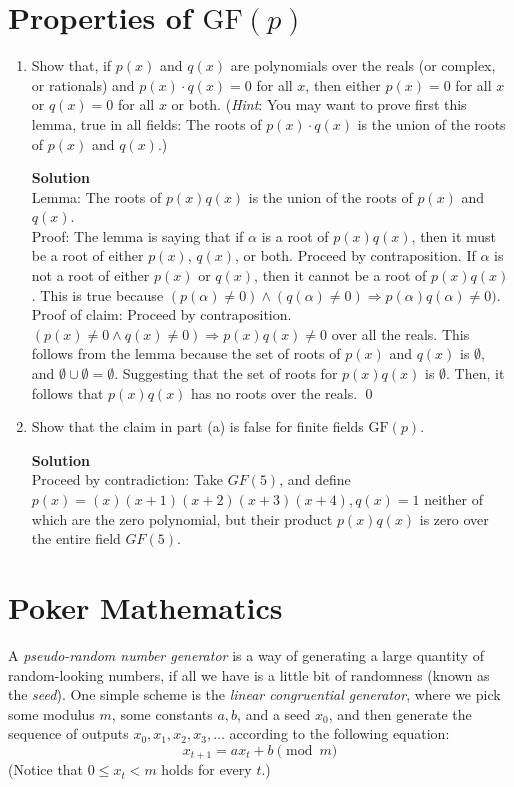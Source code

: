 \documentclass[11pt]{article}
\newcommand*{\Question}[1]{\section{#1}}
\newenvironment{Parts}{\begin{enumerate}[label=(\alph*)]}{\end{enumerate}}
\newcommand*{\Part}{\item}
\newcommand*{\GF}{\text{GF}}
\begin{document}
\Question{Properties of $\GF(p)$}

\begin{Parts}
    \Part Show that, if $p(x)$ and $q(x)$ are polynomials over the
    reals (or complex, or rationals) and $p(x)\cdot q(x) = 0$ for all
    $x$, then either $p(x)=0$ for all $x$ or $q(x)=0$ for all $x$ or both.
    (\textit{Hint}: You may want to prove first this lemma, true in all fields:
    The roots of $p(x)\cdot q(x)$ is the union of the roots of $p(x)$ and $q(x)$.)
\begin{mdframed} \textbf{Solution} \\
Lemma: The roots of $p(x)q(x)$ is the union of the roots of $p(x)$ and $q(x)$. \\
Proof: The lemma is saying that if $\alpha$ is a root of $p(x)q(x)$, then it must be a root of either $p(x)$, $q(x)$, or both. Proceed by contraposition. If $\alpha$ is not a root of either $p(x)$ or $q(x)$, then it cannot be a root of $p(x)q(x)$. This is true because $(p(\alpha) \neq 0) \land (q(\alpha) \neq 0) \Rightarrow p(\alpha)q(\alpha) \neq 0)$. \\  
Proof of claim: Proceed by contraposition. $(p(x) \neq 0 \land q(x) \neq 0) \Rightarrow p(x)q(x) \neq 0$ over all the reals. This follows from the lemma because the set of roots of $p(x)$ and $q(x)$ is $\emptyset$, and $\emptyset \cup \emptyset = \emptyset$. Suggesting that the set of roots for $p(x)q(x)$ is $\emptyset$. Then, it follows that $p(x)q(x)$ has no roots over the reals. \qed
\end{mdframed}

    \Part Show that the claim in part (a) is false for finite fields $\GF(p)$. 
\begin{mdframed} \textbf{Solution} \\
Proceed by contradiction: Take $GF(5)$, and define $p(x) = (x)(x+1)(x+2)(x+3)(x+4), q(x) = 1$ neither of which are the zero polynomial, but their product $p(x)q(x)$ is zero over the entire field $GF(5)$. 
\end{mdframed}
\end{Parts}


\Question{Poker Mathematics}   

A \emph{pseudo-random number generator} is a way of generating a large quantity of random-looking numbers, if all we have is a little bit of randomness (known as the \emph{seed}). One simple scheme is the \emph{linear congruential generator}, where we pick some modulus $m$, some constants $a,b$, and a seed $x_0$, and then generate the sequence of outputs $x_0,x_1,x_2,x_3,\dots$ according to the following equation:
\[ 
x_{t+1} = ax_t + b \pmod m
\]
(Notice that $0 \le x_t < m$ holds for every $t$.)
\end{document}

